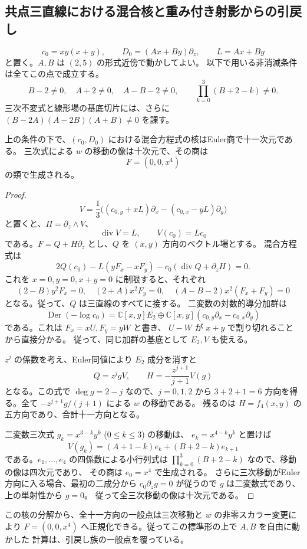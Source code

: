 \subsection{共点三直線における混合核と重み付き射影からの引戻し}
\label{subsec:concurrent-structural-v32}

\[
 c_0=xy(x+y),\qquad D_0=(Ax+By)\partial_z,
 \qquad L=Ax+By
\]
と置く。$A,B$ は $(2,5)$ の形式近傍で動かしてよい。
以下で用いる非消滅条件は全てこの点で成立する。
\[
 B-2\ne0,\quad A+2\ne0,\quad A-B-2\ne0,
 \qquad\prod_{k=0}^3(B+2-k)\ne0.
\]
三次不変式と線形場の基底切片には、さらに
$(B-2A)(A-2B)(A+B)\ne0$ を課す。

\begin{lemma}[混合核の十一方向と三次移動の十方向]
\label{lem:concurrent-mixed-kernel-v32}
上の条件の下で、$(c_0,D_0)$ における混合方程式の核はEuler商で十一次元である。
三次式による $w$ の移動の像は十次元で、その商は
\[
 F=(0,0,x^4)
\]
の類で生成される。
\end{lemma}

\begin{proof}
\[
 V=\frac13\bigl((c_{0,y}+xL)\partial_x
                 -(c_{0,x}-yL)\partial_y\bigr)
\]
と置くと、$\Pi=\partial_z\wedge V$、
\[
 \operatorname{div}V=L,\qquad V(c_0)=Lc_0
\]
である。$F=Q+H\partial_z$ とし、$Q$ を $(x,y)$ 方向のベクトル場とする。
混合方程式は
\[
 2Q(c_0)-L(yF_x-xF_y)-c_0(\operatorname{div}Q+\partial_zH)=0.
\]
これを $x=0,y=0,x+y=0$ に制限すると、それぞれ
\[
 (2-B)y^2F_x=0,\quad (2+A)x^2F_y=0,\quad
 (A-B-2)x^2(F_x+F_y)=0
\]
となる。従って、$Q$ は三直線のすべてに接する。
二変数の対数的導分加群は
\[
 \operatorname{Der}(-\log c_0)
  =\mathbb C[x,y]E_2\oplus
    \mathbb C[x,y](c_{0,y}\partial_x-c_{0,x}\partial_y)
\]
である。これは $F_x=xU,F_y=yW$ と書き、
$U-W$ が $x+y$ で割り切れることから直接分かる。
従って、同じ加群の基底として $E_2,V$ も使える。

$z^j$ の係数を考え、Euler同値により $E_2$ 成分を消すと
\[
 Q=z^j gV,\qquad
 H=-\frac{z^{j+1}}{j+1}V(g)
\]
となる。この式で $\deg g=2-j$ なので、$j=0,1,2$ から
$3+2+1=6$ 方向を得る。全て $-z^{j+1}g/(j+1)$ による $w$ の移動である。
残るのは $H=f_4(x,y)$ の五方向であり、合計十一方向となる。

二変数三次式 $g_k=x^{3-k}y^k$ ($0\leq k\leq3$) の移動は、
$e_k=x^{4-k}y^k$ と置けば
\[
 V(g_k)=(A+1-k)e_k+(B+2-k)e_{k+1}
\]
である。$e_1,\ldots,e_4$ の四係数による小行列式は
$\prod_{k=0}^3(B+2-k)$ なので、移動の像は四次元であり、
その商は $e_0=x^4$ で生成される。
さらに三次移動がEuler方向に入る場合、最初の二成分から
$c_0\partial_zg=0$ が従うので $g$ は二変数式であり、上の単射性から $g=0$。
従って全三次移動の像は十次元である。
\end{proof}

この核の分解から、全十一方向の一般点は三次移動と $w$ の非零スカラー変更により
$F=(0,0,x^4)$ へ正規化できる。従ってこの標準形の上で $A,B$ を自由に動かした
計算は、引戻し族の一般点を覆っている。
